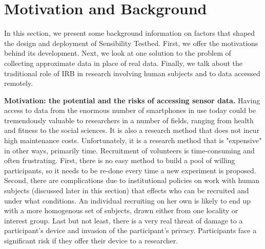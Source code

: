 \section{Motivation and Background}\label{sec-motivation}

In this section, we present some background information on 
factors that shaped the design and deployment of 
Sensibility Testbed. First, we offer the motivations behind its 
development. 
Next, we look at one solution to the problem of collecting approximate 
data in place of real data. Finally, we talk about 
the traditional role of IRB in research involving human subjects 
and to data accessed remotely. 

\textbf{Motivation: the potential and the risks of accessing sensor data.}
Having access to data from the enormous number of smartphones 
in use today could be tremendously valuable to researchers in a 
number of fields, ranging from health and fitness to the social sciences. 
It is also a research method that does not incur high maintenance costs. 
Unfortunately, it is a research method that is "expensive" in other ways, 
primarily time. Recruitment of volunteers is time-consuming and often 
frustrating. %
First, there is no easy method to build a pool of willing participants, 
so it needs to be re-done every time a new experiment is proposed. 
Second, there are complications due to institutional policies on work 
with human subjects (discussed later in this section) that effects who 
can be recruited and under what conditions. An individual recruiting 
on her own is likely to end up with a more homogenous set of subjects, 
drawn either from one locality or interest group. Last but not least, there 
is a very real threat of damage to a participant's device and invasion 
of the participant's privacy. Participants face a significant risk if 
they offer their device to a researcher.

